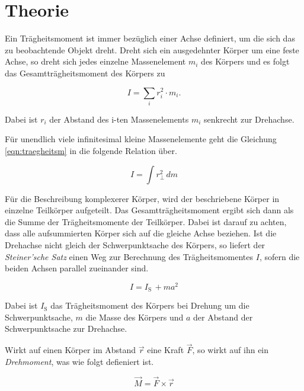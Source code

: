 \section{Theorie}
\label{sec:Theorie}

Ein Trägheitsmoment ist immer bezüglich einer Achse definiert, um die sich das zu beobachtende Objekt dreht.
Dreht sich ein ausgedehnter Körper um eine feste Achse, so dreht sich jedes einzelne Massenelement $m_i$ des Körpers
und es folgt das Gesamtträgheitsmoment des Körpers zu

\begin{equation}
    \label{eqn:traegheitsm}
    I = \sum_i r_i^2 \cdot m_i.
\end{equation}

Dabei ist $r_i$ der Abstand des i-ten Massenelements $m_i$ senkrecht zur Drehachse.

Für unendlich viele infinitesimal kleine Massenelemente geht die Gleichung \autoref{eqn:traegheitsm} in die folgende Relation über.

\begin{equation}
    \label{eqn:traegheitsmoment}
    I = \int r_{\perp}^2 \, dm
\end{equation}

Für die Beschreibung komplexerer Körper, wird der beschriebene Körper in einzelne Teilkörper aufgeteilt. Das Gesamtträgheitsmoment ergibt
sich dann als die Summe der Trägheitsmomente der Teilkörper. Dabei ist darauf zu achten, dass alle aufsummierten Körper sich auf die 
gleiche Achse beziehen.
Ist die Drehachse nicht gleich der Schwerpunktsache des Körpers, so liefert der \textit{Steiner'sche Satz} einen Weg zur Berechnung des
Trägheitsmomentes $I$, sofern die beiden Achsen parallel zueinander sind.

\begin{equation}
    \label{eqn:steiner}
    I = I_{\text{S}} \, + m a^2
\end{equation}

Dabei ist $I_{\text{S}}$ das Trägheitsmoment des Körpers bei Drehung um die Schwerpunktsache, $m$ die Masse des Körpers und $a$ der 
Abstand der Schwerpunktsache zur Drehachse. 

Wirkt auf einen Körper im Abstand $\vec r$ eine Kraft $\vec F$, so wirkt auf ihn ein \textit{Drehmoment}, was wie folgt defieniert ist.

\begin{equation}
    \label{eqn:drehmoment}
    \vec M = \vec F\times\vec r
\end{equation}

